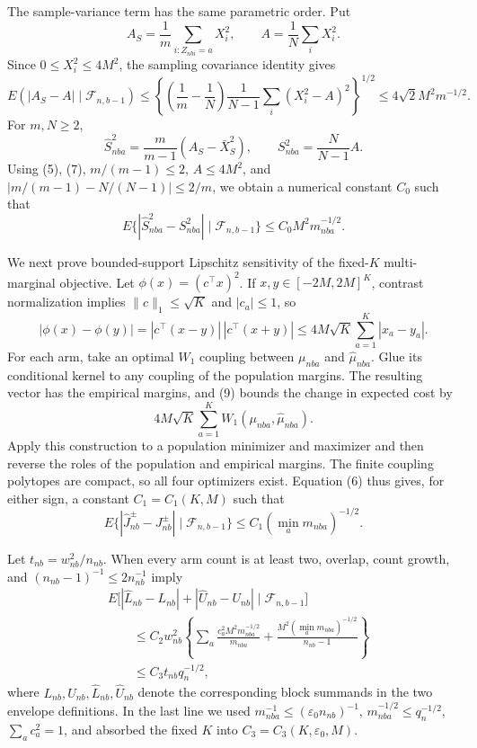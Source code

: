 The sample-variance term has the same parametric order. Put
\[
A_S=\frac1m\sum_{i:Z_{nbi}=a}X_i^2,
\qquad A=\frac1N\sum_iX_i^2.
\]
Since \(0\le X_i^2\le4M^2\), the sampling covariance identity gives
\[
E(|A_S-A|\mid\mathcal F_{n,b-1})
\le\left\{\left(\frac1m-\frac1N\right)
\frac1{N-1}\sum_i(X_i^2-A)^2\right\}^{1/2}
\le4\sqrt2 M^2m^{-1/2}.
\tag{7}
\]
For \(m,N\ge2\),
\[
\widehat S_{nba}^2=\frac{m}{m-1}(A_S-\bar X_S^2),
\qquad S_{nba}^2=\frac{N}{N-1}A.
\]
Using (5), (7), \(m/(m-1)\le2\), \(A\le4M^2\), and
\(|m/(m-1)-N/(N-1)|\le2/m\), we obtain a numerical constant \(C_0\) such that
\[
E\{|\widehat S_{nba}^2-S_{nba}^2|\mid\mathcal F_{n,b-1}\}
\le C_0M^2m_{nba}^{-1/2}.
\tag{8}
\]

We next prove bounded-support Lipschitz sensitivity of the fixed-\(K\) multi-marginal objective. Let \(\phi(x)=(c^\top x)^2\). If \(x,y\in[-2M,2M]^K\), contrast normalization implies \(\|c\|_1\le\sqrt K\) and \(|c_a|\le1\), so
\[
|\phi(x)-\phi(y)|
=|c^\top(x-y)|\,|c^\top(x+y)|
\le4M\sqrt K\sum_{a=1}^K|x_a-y_a|.
\tag{9}
\]
For each arm, take an optimal \(W_1\) coupling between \(\mu_{nba}\) and \(\widehat\mu_{nba}\). Glue its conditional kernel to any coupling of the population margins. The resulting vector has the empirical margins, and (9) bounds the change in expected cost by
\[
4M\sqrt K\sum_{a=1}^K W_1(\mu_{nba},\widehat\mu_{nba}).
\]
Apply this construction to a population minimizer and maximizer and then reverse the roles of the population and empirical margins. The finite coupling polytopes are compact, so all four optimizers exist. Equation (6) thus gives, for either sign, a constant \(C_1=C_1(K,M)\) such that
\[
E\{|\widehat J_{nb}^{\pm}-J_{nb}^{\pm}|\mid\mathcal F_{n,b-1}\}
\le C_1\left(\min_a m_{nba}\right)^{-1/2}.
\tag{10}
\]

Let \(t_{nb}=w_{nb}^2/n_{nb}\). When every arm count is at least two, overlap, count growth, and \((n_{nb}-1)^{-1}\le2n_{nb}^{-1}\) imply
\[
\begin{aligned}
&E\bigl[|\widehat L_{nb}-L_{nb}|+|\widehat U_{nb}-U_{nb}|
\mid\mathcal F_{n,b-1}\bigr]\\
&\qquad\le
C_2w_{nb}^2\left\{
\sum_a\frac{c_a^2M^2m_{nba}^{-1/2}}{m_{nba}}
+\frac{M^2(\min_am_{nba})^{-1/2}}{n_{nb}-1}\right\}\\
&\qquad\le C_3t_{nb}q_n^{-1/2},
\end{aligned}
\tag{11}
\]
where \(L_{nb},U_{nb},\widehat L_{nb},\widehat U_{nb}\) denote the corresponding block summands in the two envelope definitions. In the last line we used \(m_{nba}^{-1}\le(\varepsilon_0n_{nb})^{-1}\), \(m_{nba}^{-1/2}\le q_n^{-1/2}\), \(\sum_ac_a^2=1\), and absorbed the fixed \(K\) into \(C_3=C_3(K,\varepsilon_0,M)\).

